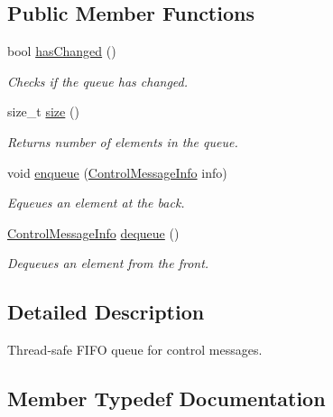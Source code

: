 \subsection*{Public Member Functions}
\begin{DoxyCompactItemize}
\item 
bool \mbox{\hyperlink{classControlMessageQueue_ad0d97de85cb34b781fde757b665fb22e}{has\+Changed}} ()
\begin{DoxyCompactList}\small\item\em Checks if the queue has changed. \end{DoxyCompactList}\item 
size\+\_\+t \mbox{\hyperlink{classControlMessageQueue_a3b2d120facfc58fcdc315a806d76851a}{size}} ()
\begin{DoxyCompactList}\small\item\em Returns number of elements in the queue. \end{DoxyCompactList}\item 
void \mbox{\hyperlink{classControlMessageQueue_a766bed9ca18a663bba82cc32c253049a}{enqueue}} (\mbox{\hyperlink{structControlMessageQueue_1_1ControlMessageInfo}{Control\+Message\+Info}} info)
\begin{DoxyCompactList}\small\item\em Equeues an element at the back. \end{DoxyCompactList}\item 
\mbox{\hyperlink{structControlMessageQueue_1_1ControlMessageInfo}{Control\+Message\+Info}} \mbox{\hyperlink{classControlMessageQueue_a95142f7602e0a64b38a8f1cb02ef9497}{dequeue}} ()
\begin{DoxyCompactList}\small\item\em Dequeues an element from the front. \end{DoxyCompactList}\end{DoxyCompactItemize}


\subsection{Detailed Description}
Thread-\/safe F\+I\+FO queue for control messages. 

\subsection{Member Typedef Documentation}
\mbox{\label{classControlMessageQueue_a50df92d449dae01e49fd0e836c7d1f2e}} 
